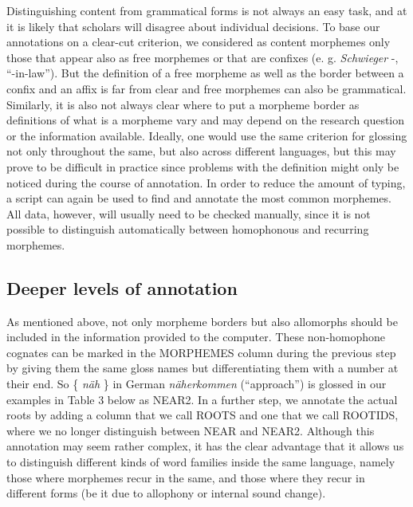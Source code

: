 \documentclass[
  a4paper,
  14pt,
  oneside,
  tablecaptionabove
]{scrbook}
\begin{document}
Distinguishing content from grammatical forms is not always an easy
task, and at it is likely that scholars will disagree about individual
decisions. To base our annotations on a clear-cut criterion, we
considered as content morphemes only those that appear also as free
morphemes or that are confixes (e. g. \emph{Schwieger} -,
\enquote{-in-law}). But the definition of a free morpheme as well as the
border between a confix and an affix is far from clear and free
morphemes can also be grammatical. Similarly, it is also not always
clear where to put a morpheme border as definitions of what is a
morpheme vary and may depend on the research question or the information
available. Ideally, one would use the same criterion for glossing not
only throughout the same, but also across different languages, but this
may prove to be difficult in practice since problems with the definition
might only be noticed during the course of annotation. In order to
reduce the amount of typing, a script can again be used to find and
annotate the most common morphemes. All data, however, will usually need
to be checked manually, since it is not possible to distinguish
automatically between homophonous and recurring morphemes.

\subsection*{Deeper levels of
annotation}

As mentioned above, not only morpheme borders but also allomorphs should
be included in the information provided to the computer. These
non-homophone cognates can be marked in the MORPHEMES column during the
previous step by giving them the same gloss names but differentiating
them with a number at their end. So \{ \emph{näh} \} in German
\emph{näherkommen} (\enquote{approach}) is glossed in our examples in
Table 3 below as NEAR2. In a further step, we annotate the actual roots
by adding a column that we call ROOTS and one that we call ROOTIDS,
where we no longer distinguish between NEAR and NEAR2. Although this
annotation may seem rather complex, it has the clear advantage that it
allows us to distinguish different kinds of word families inside the
same language, namely those where morphemes recur in the same, and those
where they recur in different forms (be it due to allophony or internal
sound change).
\end{document}

